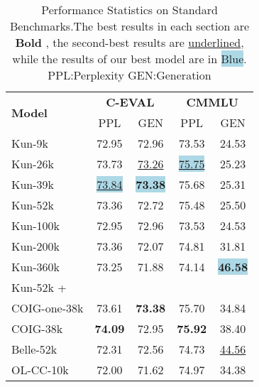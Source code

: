 \begin{table}{}
\centering
\small
\begin{tabular}{lcccc}

\toprule 
\multirow{2}{*}{\textbf{Model}} & \multicolumn{2}{c}{\textbf{C-EVAL}} & \multicolumn{2}{c}{\textbf{CMMLU}} \\
                                & PPL    & GEN   & PPL    & GEN \\

\midrule

Kun-9k                          & 72.95               & 72.96             & 73.53               & 24.53    \\
Kun-26k         &73.73     &\underline{73.26}           & \definecolor{lightblue}{rgb}{0.68, 0.85, 0.9}\colorbox{lightblue}{\underline{75.75}}               & 25.23    \\
Kun-39k                         & \definecolor{lightblue}{rgb}{0.68, 0.85, 0.9}\colorbox{lightblue}{\underline{73.84}}               & \definecolor{lightblue}{rgb}{0.68, 0.85, 0.9}\colorbox{lightblue}{\textbf{73.38}}             & 75.68               & 25.31    \\
Kun-52k                         & 73.36               & 72.72             & 75.48               & 25.50    \\
Kun-100k                        & 72.95               & 72.96             & 73.53               & 24.53    \\
Kun-200k                        & 73.36               & 72.07             & 74.81               & 31.81    \\
Kun-360k                        & 73.25               & 71.88             & 74.14               & \definecolor{lightblue}{rgb}{0.68, 0.85, 0.9}\colorbox{lightblue}{\textbf{46.58}}    \\
\midrule
Kun-52k + & & & &\\
COIG-one-38k          & \multirow{-2}{*}{73.61}               &\multirow{-2}{*}{\textbf{73.38}}     & \multirow{-2}{*}{75.70}     & \multirow{-2}{*}{34.84}    \\
\midrule
COIG-38k                & \textbf{74.09}               & 72.95             &\textbf{75.92}               & 38.40    \\
Belle-52k                       & 72.31               & 72.56             & 74.73               &\underline{44.56}    \\
OL-CC-10k                       & 72.00               & 71.62             & 74.97               & 34.38    \\
\bottomrule
\end{tabular}

\caption{Performance Statistics on Standard Benchmarks.The best results in
each section are \textbf{Bold} , the second-best results are \underline{underlined}, while the results of our best model are in \colorbox{lightblue}{Blue}. PPL:Perplexity  GEN:Generation }

\label{tab:benchmark_stats}
\end{table}

